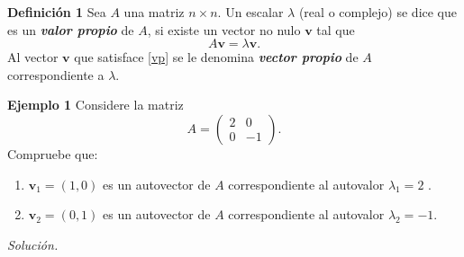 {\nologo 
\begin{frame}%

\begin{defi}{\textbf{Definición 1}}\justifying
	\justifying
	Sea $A$ una matriz $n\times n$. Un escalar $\lambda$ (real o complejo) se dice que es un \textbf{\textit{valor propio}}
	de $A$, si existe un vector no nulo $\mathbf{v}$ tal que
	\begin{equation}\tag{1}%
	A \mathbf{v} = \lambda \mathbf{v}.
	\end{equation}
	Al vector $\mathbf{v}$ que satisface \eqref{vp} se le denomina \textbf{\textit{vector propio}} de $A$ correspondiente a $\lambda$.
\end{defi}	

\begin{ej}{\textbf{Ejemplo 1}}
	Considere la matriz
	\[
	A =
	\left(
	\begin{array}{rr}
	2 &  0\\[1mm]
	0 & -1
	\end{array}
	\right).
	\]	
	Compruebe que:
	\begin{enumerate}[$a$]
		\item $\mathbf{v}_1=(1,0)$ es un autovector de $A$ correspondiente 
		al autovalor $\lambda_1 = 2$ . \\[2mm]
		\item $\mathbf{v}_2=(0,1)$ es un autovector de $A$ correspondiente 
		al autovalor $\lambda_2 = -1$.
	\end{enumerate}
\end{ej}
\textit{Solución.}

\end{frame}
}


\subsection{}

